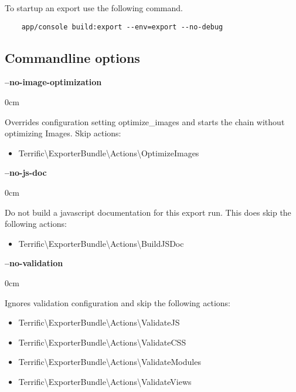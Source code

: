 \newcommand{\cmdoptiondesc}[2]{
    \noindent \textbf{#1}\\
    \vspace{-1em}
    \begin{adjustwidth}{\parindent}{0cm}
        #2
    \end{adjustwidth}
    \vspace{1em}
}



To startup an export use the following command.

\begin{verbatim}
    app/console build:export --env=export --no-debug
\end{verbatim}



\subsection{Commandline options}

\cmdoptiondesc{--no-image-optimization}{
    Overrides configuration setting optimize\_images and starts the chain without optimizing Images. Skip actions:
    \begin{itemize}
          \item{Terrific\textnormal{\textbackslash}ExporterBundle\textnormal{\textbackslash}Actions\textnormal{\textbackslash}OptimizeImages}
    \end{itemize}
}

\cmdoptiondesc{--no-js-doc} {
    Do not build a javascript documentation for this export run. This does skip the following actions:
    \begin{itemize}
        \item{Terrific\textnormal{\textbackslash}ExporterBundle\textnormal{\textbackslash}Actions\textnormal{\textbackslash}BuildJSDoc}
    \end{itemize}
}

\cmdoptiondesc{--no-validation} {
    Ignores validation configuration and skip the following actions:
    \begin{itemize}
          \item{Terrific\textnormal{\textbackslash}ExporterBundle\textnormal{\textbackslash}Actions\textnormal{\textbackslash}ValidateJS}
          \item{Terrific\textnormal{\textbackslash}ExporterBundle\textnormal{\textbackslash}Actions\textnormal{\textbackslash}ValidateCSS}
          \item{Terrific\textnormal{\textbackslash}ExporterBundle\textnormal{\textbackslash}Actions\textnormal{\textbackslash}ValidateModules}
          \item{Terrific\textnormal{\textbackslash}ExporterBundle\textnormal{\textbackslash}Actions\textnormal{\textbackslash}ValidateViews}
    \end{itemize}
}


